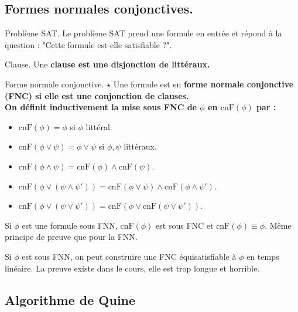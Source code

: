 \documentclass[french, 11pt]{article}
\newcommand*{\cnF}{\text{cnF}}
\begin{document}
\subsection{Formes normales conjonctives.}

\begin{defi}{Problème SAT.}{}
    Le problème SAT prend une formule en entrée et répond à la question : "Cette formule est-elle satisfiable ?".
\end{defi}

\begin{defi}{Clause.}{}
    Une \bf{clause} est une disjonction de littéraux.
\end{defi}

\begin{defi}{Forme normale conjonctive. $\star$}{}
    Une formule est en \bf{forme normale conjonctive (FNC)} si elle est une conjonction de clauses.\\
    On définit inductivement la mise sous FNC de $\phi$ en $\cnF(\phi)$ par :
    \begin{itemize}[topsep=0pt,itemsep=-0.9 ex]
        \item $\cnF(\phi)=\phi$ si $\phi$ littéral.
        \item $\cnF(\phi\lor\psi)=\phi\lor\psi$ si $\phi,\psi$ littéraux.
        \item $\cnF(\phi\land\psi)=\cnF(\phi)\land\cnF(\psi)$.
        \item $\cnF(\phi\lor(\psi\land\psi'))=\cnF(\phi\lor\psi)\land\cnF(\phi\land\psi')$.
        \item $\cnF(\phi\lor(\psi\lor\psi'))=\cnF(\phi\lor\cnF(\psi\lor\psi'))$.
    \end{itemize}
\end{defi}

\begin{prop}{}{}
    Si $\phi$ est une formule sous FNN, $\cnF(\phi)$ est sous FNC et $\cnF(\phi)\equiv\phi$.
    \tcblower
    Même principe de preuve que pour la FNN.
\end{prop}

\begin{prop}{}{}
    Si $\phi$ est sous FNN, on peut construire une FNC équisatisfiable à $\phi$ en temps linéaire.
    \tcblower
    La preuve existe dans le cours, elle est trop longue et horrible.
\end{prop}

\subsection{Algorithme de Quine}
\end{document}
